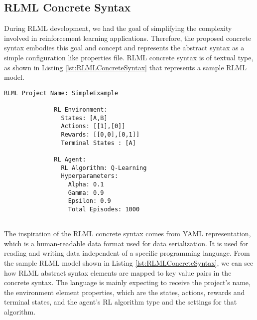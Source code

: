 \documentclass[11pt,letterpaper]{ryersonSGSThesis}
\begin{document}
\begin{ryersonSGSThesis}
          
          
        
    \section {RLML Concrete Syntax}
        During RLML development, we had the goal of simplifying the complexity involved in reinforcement learning applications. Therefore, the proposed concrete syntax embodies this goal and concept and represents the abstract syntax as a simple configuration like properties file. RLML concrete syntax is of textual type, as shown in Listing \ref{lst:RLMLConcreteSyntax} that represents a sample RLML model.
        
        \begin{minipage}{\linewidth}
            \begin{lstlisting}[caption={RLML Concrete Syntax.},label={lst:RLMLConcreteSyntax}]
              RLML Project Name: SimpleExample 
             
              RL Environment: 
                States: [A,B] 
                Actions: [[1],[0]] 
                Rewards: [[0,0],[0,1]] 
                Terminal States : [A] 
               
              RL Agent: 
                RL Algorithm: Q-Learning 
                Hyperparameters: 
                  Alpha: 0.1 
                  Gamma: 0.9 
                  Epsilon: 0.9 
                  Total Episodes: 1000 
               
            \end{lstlisting}
        \end{minipage}
        
        The inspiration of the RLML concrete syntax comes from YAML representation, which is a human-readable data format used for data serialization. It is used for reading and writing data independent of a specific programming language.
        From the sample RLML model shown in Listing \ref{lst:RLMLConcreteSyntax}, we can see how RLML abstract syntax elements are mapped to key value pairs in the concrete syntax. The language is mainly expecting to receive the project's name, the environment element properties, which are the states, actions, rewards and terminal states, and the agent's RL algorithm type and the settings for that algorithm.


\end{ryersonSGSThesis}
\end{document}
